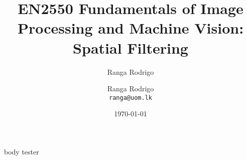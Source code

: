 \documentclass[aspectratio=169,xcolor={svgnames}, beamer, 10pt]{beamer}
\title{EN2550 Fundamentals of Image Processing and Machine Vision: Spatial Filtering}
\author{Ranga Rodrigo}
\author[]{Ranga Rodrigo\\ \texttt{ranga@uom.lk}}
\institute[]{The University of Moratuwa, Sri Lanka}
\date{\today}
\begin{document}
    \begin{frame}
        \titlepage
    \end{frame}


    {body}
    {tester}
\end{document}
